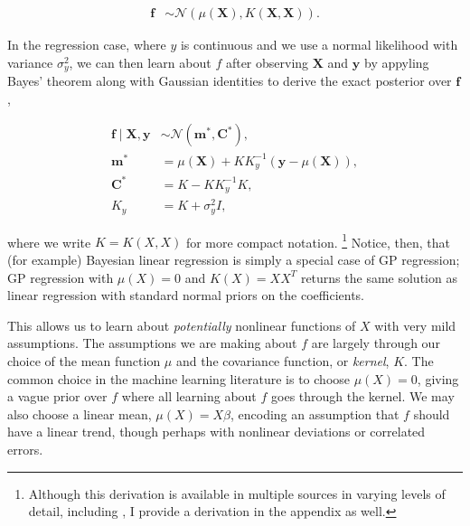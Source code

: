 \documentclass{draft}
\begin{document}
\vspace*{-\baselineskip}
\begin{align}
    \mathbf{f} & \sim \mathcal{N} \left( \mu \left( \mathbf{X} \right), K \left( \mathbf{X}, \mathbf{X} \right) \right).
\end{align}

In the regression case,
where \( y \) is continuous and we use a normal likelihood with variance \( \sigma_y^2 \),
we can then learn about \( f \) after observing \( \mathbf{X} \) and \( \mathbf{y} \)
by appyling Bayes' theorem along with Gaussian identities to derive the exact posterior over
\( \mathbf{f} \),

\vspace*{-\baselineskip}
\begin{align}
    \mathbf{f} \mid \mathbf{X}, \mathbf{y}
    & \sim
    \mathcal{N} \left( \mathbf{m}^\ast, \mathbf{C}^\ast \right), \label{eq:gpr-posterior} \\
    \mathbf{m}^\ast
    & =
    \mu \left( \mathbf{X} \right) + K K_y^{-1} \left( \mathbf{y} - \mu \left( \mathbf{X} \right) \right), \\
    \mathbf{C}^\ast
    & =
    K - K K_y^{-1} K, \\
    K_y & = K + \sigma_y^2 I,
\end{align}

\noindent
where we write \( K = K \left( X, X \right) \) for more compact notation.%
\footnote{
    Although this derivation is available in multiple sources in varying levels of detail,
    including \citet{RasmussenWilliams2006Gaussian},
    I provide a derivation in the appendix as well.
}
Notice, then, that (for example) Bayesian linear regression is simply a special case of GP regression;
GP regression with \( \mu \left( X \right) = 0 \) and \( K \left( X \right) = X X^T \) returns the same solution
as linear regression with standard normal priors on the coefficients.

This allows us to learn about \emph{potentially} nonlinear functions of \( X \) with very mild assumptions.
The assumptions we are making about \( f \) are largely through our choice of the mean function
\( \mu \) and the covariance function, or \emph{kernel}, \( K \).
The common choice in the machine learning literature is to choose \( \mu \left( X \right) = 0 \),
giving a vague prior over \( f \) %
where all learning about \( f \) goes through the kernel.
We may also choose a linear mean, \( \mu \left( X \right) = X \beta \),
encoding an assumption that \( f \) should have a linear trend,
though perhaps with nonlinear deviations or correlated errors.
\end{document}
